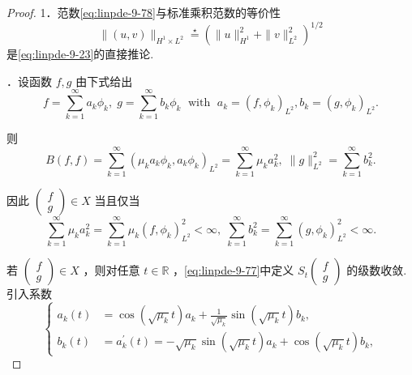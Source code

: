 \begin{proof}
1．范数\eqref{eq:linpde-9-78}与标准乘积范数的等价性
\[
\| \left( {u,v}\right) {\| }_{{H}^{1} \times  {L}^{2}}\overset{ \star  }{ = }{\left( \| u{\| }_{{H}^{1}}^{2} + \| v{\| }_{{L}^{2}}^{2}\right) }^{1/2}
\]
是\eqref{eq:linpde-9-23}的直接推论.

．设函数 $f,g$ 由下式给出
\[
f = \sum_{{k = 1}}^{\infty }{a}_{k}{\phi }_{k},\;g = \sum_{{k = 1}}^{\infty }{b}_{k}{\phi }_{k}\;\text{ with }\;{a}_{k} = {\left( f,{\phi }_{k}\right) }_{{L}^{2}},{b}_{k} = {\left( g,{\phi }_{k}\right) }_{{L}^{2}}.
\]

则
\[
B\left(  {f,f}\right)   = \sum_{{k = 1}}^{\infty }{\left( {\mu }_{k}{a}_{k}{\phi }_{k},{a}_{k}{\phi }_{k}\right) }_{{L}^{2}} = \sum_{{k = 1}}^{\infty }{\mu }_{k}{a}_{k}^{2},\;\| g{\| }_{{L}^{2}}^{2} = \sum_{{k = 1}}^{\infty }{b}_{k}^{2}.
\]

因此 $\begin{pmatrix}f \\ g\end{pmatrix}  \in  X$ 当且仅当
\begin{equation}\tag{9.79}\label{eq:linpde-9-79}
\sum_{{k = 1}}^{\infty }{\mu }_{k}{a}_{k}^{2} = \sum_{{k = 1}}^{\infty }{\mu }_{k}{\left( f,{\phi }_{k}\right) }_{{L}^{2}}^{2} < \infty ,\;\sum_{{k = 1}}^{\infty }{b}_{k}^{2} = \sum_{{k = 1}}^{\infty }{\left( g,{\phi }_{k}\right) }_{{L}^{2}}^{2} < \infty .
\end{equation}

若 $\begin{pmatrix}f \\ g\end{pmatrix}  \in  X$ ，则对任意 $t \in  \mathbb{R}$ ，\eqref{eq:linpde-9-77}中定义 ${S}_{t}\begin{pmatrix}f \\ g\end{pmatrix}$ 的级数收敛.引入系数
\begin{equation}\tag{9.80}\label{eq:linpde-9-80}
\left\{  \begin{array}{ll} {a}_{k}\left( t\right) &  = \cos \left( {\sqrt{{\mu }_{k}}t}\right) {a}_{k} + \frac{1}{\sqrt{{\mu }_{k}}}\sin \left( {\sqrt{{\mu }_{k}}t}\right) {b}_{k}, \\  {b}_{k}\left( t\right) &  = {a}_{k}^{\prime }\left( t\right)  =  - \sqrt{{\mu }_{k}}\sin \left( {\sqrt{{\mu }_{k}}t}\right) {a}_{k} + \cos \left( {\sqrt{{\mu }_{k}}t}\right) {b}_{k}, \end{array}\right.
\end{equation}


\end{proof}
